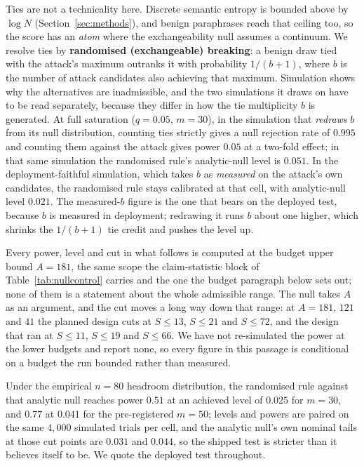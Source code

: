 Ties are not a technicality here. Discrete semantic entropy is bounded above by $\log N$
(Section~\ref{sec:methods}), and benign paraphrases reach that ceiling too, so
the score has an \emph{atom} where the exchangeability null assumes a continuum. We resolve
ties by \textbf{randomised (exchangeable) breaking}: a benign draw tied with the attack's
maximum outranks it with probability $1/(b{+}1)$, where $b$ is the number of attack
candidates also achieving that maximum. Simulation shows why the alternatives are
inadmissible, and the two simulations it draws on have to be read separately, because they
differ in how the tie multiplicity $b$ is generated. At
full saturation ($q{=}0.05$, $m{=}30$), in the simulation that \emph{redraws} $b$ from its
null distribution, counting ties strictly gives a null rejection rate of $0.995$ and
counting them against the attack gives power $0.05$ at a two-fold effect; in that same
simulation the randomised rule's analytic-null level is $0.051$. In the deployment-faithful
simulation, which takes $b$ as \emph{measured} on the attack's own candidates, the
randomised rule stays calibrated at that cell, with analytic-null level $0.021$. The
measured-$b$ figure is the one that bears on the deployed test, because $b$ is measured in
deployment; redrawing it runs $b$ about one higher, which shrinks the $1/(b{+}1)$ tie credit
and pushes the level up.

Every power, level and cut in what follows is computed at the budget upper bound
$A{=}181$, the same scope the claim-statistic block of Table~\ref{tab:nullcontrol} carries
and the one the budget paragraph below sets out; none of them is a statement about the whole
admissible range. The null takes $A$ as an argument, and the cut moves a long way down that
range: at $A{=}181$, $121$ and $41$ the planned design cuts at $S{\leq}13$, $S{\leq}21$ and
$S{\leq}72$, and the design that ran at $S{\leq}11$, $S{\leq}19$ and $S{\leq}66$. We have
not re-simulated the power at the lower budgets and report none, so every figure in this
passage is conditional on a budget the run bounded rather than measured.

Under the empirical $n{=}80$ headroom distribution, the randomised rule against that
analytic null reaches power $0.51$ at an achieved level of $0.025$ for $m{=}30$, and $0.77$
at $0.041$ for the pre-registered $m{=}50$; levels and powers are paired on the same
$4{,}000$ simulated trials per cell, and the analytic null's own nominal tails at those cut
points are $0.031$ and $0.044$, so the shipped test is stricter than it believes itself to
be. We quote the deployed test throughout.

